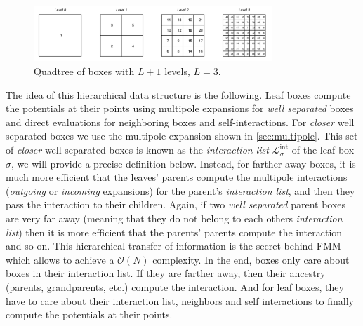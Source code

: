 \documentclass[final,onefignum,onetabnum]{siamart220329}
\newcommand{\Ocal}{\mathcal{O}}
\begin{document}
\begin{figure}[h!]
	\centering
	\includegraphics[width=0.8\textwidth]{tree}
	\caption{Quadtree of boxes with $L+1$ levels, $L=3$.}
	\label{fig:tree}
\end{figure}

The idea of this hierarchical data structure is the following. Leaf boxes compute the potentials at their points using multipole expansions for \textit{well separated} boxes and direct evaluations for neighboring boxes and self-interactions. For \textit{closer} well separated boxes we use the multipole expansion shown in \cref{sec:multipole}. This set of \textit{closer} well separated boxes is known as the \textit{interaction list} $\mathcal{L}_\sigma^\text{int}$ of the leaf box $\sigma$, we will provide a precise definition below. Instead, for farther away boxes, it is much more efficient that the leaves' parents compute the multipole interactions (\textit{outgoing} or \textit{incoming} expansions) for the parent's \textit{interaction list}, and then they pass the interaction to their children. Again, if two \textit{well separated} parent boxes are very far away (meaning that they do not belong to each others \textit{interaction list}) then it is more efficient that the parents' parents compute the interaction and so on. This hierarchical transfer of information is the secret behind FMM which allows to achieve a $\Ocal(N)$ complexity. In the end, boxes only care about boxes in their interaction list. If they are farther away, then their ancestry (parents, grandparents, etc.) compute the interaction. And for leaf boxes, they have to care about their interaction list, neighbors and self interactions to finally compute the potentials at their points.
\end{document}
